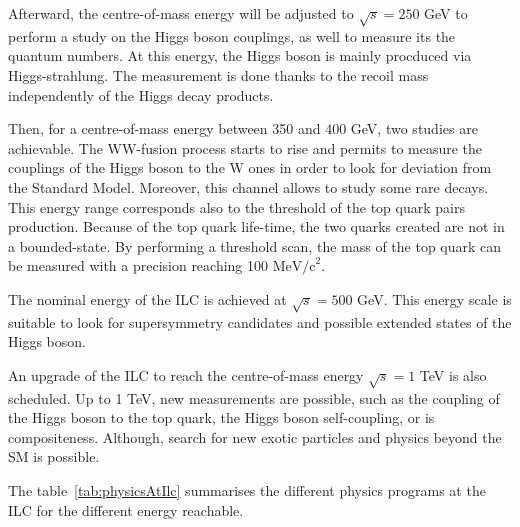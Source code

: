    Afterward, the centre-of-mass energy will be adjusted to $\sqrt{s} = 250$ GeV to perform a study on the Higgs boson couplings, as well to measure its the quantum numbers.
   At this energy, the Higgs boson is mainly procduced via Higgs-strahlung.
   The measurement is done thanks to the recoil mass independently of the Higgs decay products.
 
   Then, for a centre-of-mass energy between 350 and 400 GeV, two studies are achievable. 
   The WW-fusion process starts to rise and permits to measure the couplings of the Higgs boson to the W ones in order to look for deviation from the Standard Model. 
   Moreover, this channel allows to study some rare decays. 
   This energy range corresponds also to the threshold of the top quark pairs production.
   Because of the top quark life-time, the two quarks created are not in a bounded-state. 
   By performing a threshold scan, the mass of the top quark can be measured with a precision reaching 100 $\text{MeV/c}^2$.

   The nominal energy of the \gls{ILC} is achieved at $\sqrt{s} = 500$ GeV.
   This energy scale is suitable to look for supersymmetry candidates and possible extended states of the Higgs boson.

   An upgrade of the ILC to reach the centre-of-mass energy $\sqrt{s} = 1$ TeV is also scheduled.
   Up to 1 TeV, new measurements are possible, such as the coupling of the Higgs boson to the top quark, the Higgs boson self-coupling, or is compositeness.
   Although, search for new exotic particles and physics beyond the \gls{SM} is possible.
    
   The table~\ref{tab:physicsAtIlc} summarises the different physics programs at the ILC for the different energy reachable.  

